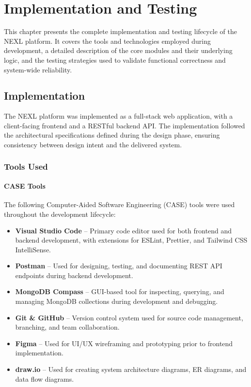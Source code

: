 
\chapter{Implementation and Testing}

This chapter presents the complete implementation and testing lifecycle of the NEXL platform. It covers the tools and technologies employed during development, a detailed description of the core modules and their underlying logic, and the testing strategies used to validate functional correctness and system-wide reliability.

\section{Implementation}

The NEXL platform was implemented as a full-stack web application, with a client-facing frontend and a RESTful backend API. The implementation followed the architectural specifications defined during the design phase, ensuring consistency between design intent and the delivered system.

\subsection{Tools Used}

\subsubsection{CASE Tools}
The following Computer-Aided Software Engineering (CASE) tools were used throughout the development lifecycle:

\begin{itemize}employed
    \item \textbf{Visual Studio Code} -- Primary code editor used for both frontend and backend development, with extensions for ESLint, Prettier, and Tailwind CSS IntelliSense.
    \item \textbf{Postman} -- Used for designing, testing, and documenting REST API endpoints during backend development.
    \item \textbf{MongoDB Compass} -- GUI-based tool for inspecting, querying, and managing MongoDB collections during development and debugging.
    \item \textbf{Git \& GitHub} -- Version control system used for source code management, branching, and team collaboration.
    \item \textbf{Figma} -- Used for UI/UX wireframing and prototyping prior to frontend implementation.
    \item \textbf{draw.io} -- Used for creating system architecture diagrams, ER diagrams, and data flow diagrams.
\end{itemize}

